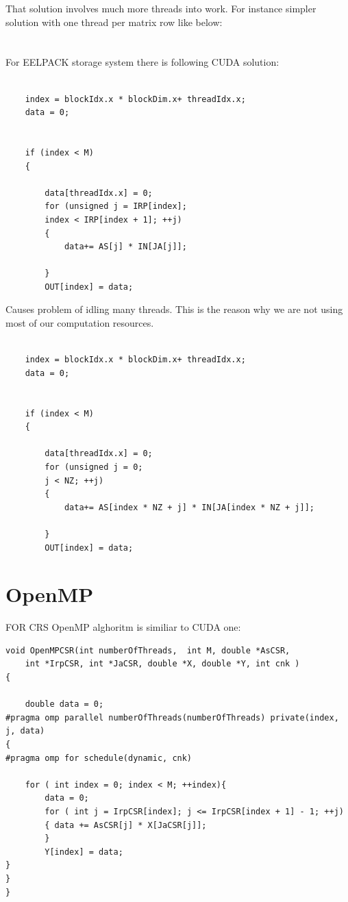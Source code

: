 \documentclass{scrreprt}
\begin{document}
That solution involves much more threads into work. For instance simpler solution with one thread per matrix row 
like below:\\\\
\\
For EELPACK storage system there is following CUDA solution:\\

\begin{lstlisting}

	index = blockIdx.x * blockDim.x+ threadIdx.x;
	data = 0;


	if (index < M)
	{

		data[threadIdx.x] = 0;
		for (unsigned j = IRP[index]; 
		index < IRP[index + 1]; ++j)
		{
			data+= AS[j] * IN[JA[j]];
		
		}
		OUT[index] = data;
\end{lstlisting}

Causes problem of idling many threads. This is the reason why we are not using most of our computation resources.


\begin{lstlisting}

	index = blockIdx.x * blockDim.x+ threadIdx.x;
	data = 0;


	if (index < M)
	{

		data[threadIdx.x] = 0;
		for (unsigned j = 0; 
		j < NZ; ++j)
		{
			data+= AS[index * NZ + j] * IN[JA[index * NZ + j]];
		
		}
		OUT[index] = data;
\end{lstlisting}



\chapter{OpenMP}

FOR CRS OpenMP alghoritm is similiar to CUDA one:\\

\begin{lstlisting}
void OpenMPCSR(int numberOfThreads,  int M, double *AsCSR, 
	int *IrpCSR, int *JaCSR, double *X, double *Y, int cnk )
{ 
	
	double data = 0;
#pragma omp parallel numberOfThreads(numberOfThreads) private(index, j, data) 
{ 
#pragma omp for schedule(dynamic, cnk) 

	for ( int index = 0; index < M; ++index){ 
		data = 0; 
		for ( int j = IrpCSR[index]; j <= IrpCSR[index + 1] - 1; ++j)
		{ data += AsCSR[j] * X[JaCSR[j]]; 
		} 
		Y[index] = data; 
}
} 
}
\end{lstlisting}
\end{document}
